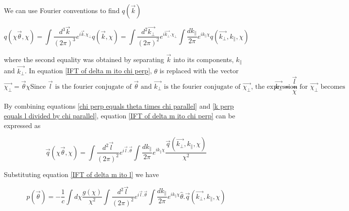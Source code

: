 \documentclass[12pt]{article}
\begin{document}
\noindent We can use Fourier conventions to find $q(\vec{k})$

\begin{equation}\label{IFT of delta m ito chi perp}
q(\chi\vec{\theta},\chi)=\int \frac{d^3 \vec{k}}{(2 \pi)^3} e^{i\vec{k}.\chi_{\bot}}q(\vec{k},\chi )=\int \frac{d^2 \vec{k_\bot}}{(2\pi)^2} e^{i\vec{k_\bot}.\chi_\bot} \int \frac{dk_\parallel}{2\pi} e^{ik_{\parallel}\chi } q(\vec{k_\bot},k_\parallel,\chi )
\end{equation}

\noindent where the second equality was obtained by separating $\vec{k}$ into its components, $k_\parallel$ and $\vec{k_\bot}$. In equation \ref{IFT of delta m ito chi perp}, $\theta$ is replaced with the vector 
\begin{subequations}
	\begin{equation}\label{chi perp equals theta times chi parallel}
	\vec{\chi_{\bot}}=\vec{\theta}\chi 
	\end{equation}
	\text{Since $\vec{l}$ is the fourier conjugate of $\vec{\theta}$ and $\vec{k_{\bot}}$ is the fourier conjugate of $\vec{\chi_{\bot}}$, the expression for $\vec{\chi_{\bot}}$ becomes}
	\begin{equation}\label{k perp equals l divided by chi parallel}
	\vec{k_{\bot}}=\frac{\vec{l}}{\chi }
	\end{equation}
\end{subequations}

By combining equations \ref{chi perp equals theta times chi parallel} and \ref{k perp equals l divided by chi parallel}, equation \ref{IFT of delta m ito chi perp} can be expressed as 

\begin{equation}\label{IFT of delta m ito l}
\vec{q}(\chi\vec{\theta},\chi )=\int \frac{d^2 \vec{l}}{(2\pi)^2} e^{i\vec{l}.\vec{\theta}} \int \frac{dk_\parallel}{2\pi} e^{ik_{\parallel}\chi }\frac{\vec{q}(\vec{k_\bot},k_\parallel,\chi )}{\chi ^2}
\end{equation}

Substituting equation \ref{IFT of delta m ito l} we have

\begin{equation}\label{kappa of theta with l}
p(\vec{\theta})=-\frac{1}{c}\int d\chi \frac{g(\chi )}{\chi ^2}\int \frac{d^2 \vec{l}}{(2\pi)^2} e^{i \vec{l}.\vec{\theta}} \int \frac{dk_\parallel}{2\pi} e^{ik_{\parallel}\chi }\hat{\theta}.\vec{q}(\vec{k_\bot},k_\parallel,\chi )
\end{equation}
\end{document}

